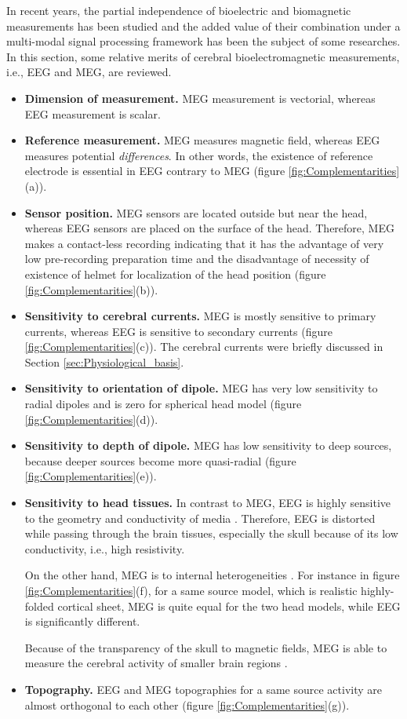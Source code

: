 In recent years, the partial independence of bioelectric and biomagnetic measurements has been studied and the added value of their combination under a multi-modal signal processing framework has been the subject of some researches.
In this section, some relative merits of cerebral bioelectromagnetic measurements, i.e., EEG and MEG, are reviewed.
\begin{itemize}
\item \textbf{Dimension of measurement.} MEG measurement is vectorial, whereas EEG measurement is scalar.
\item \textbf{Reference measurement.} MEG measures magnetic field, whereas EEG measures potential \emph{differences}.
In other words, the existence of reference electrode is essential in EEG contrary to MEG (figure \ref{fig:Complementarities}(a)).
\item \textbf{Sensor position.} MEG sensors are located outside but near the head, whereas EEG sensors are placed on the surface of the head.
Therefore, MEG makes a contact-less recording indicating that it has the advantage of very low pre-recording preparation time and the disadvantage of necessity of existence of helmet for localization of the head position (figure \ref{fig:Complementarities}(b)).
\item \textbf{Sensitivity to cerebral currents.} MEG is mostly sensitive to primary currents, whereas EEG is sensitive to secondary currents (figure \ref{fig:Complementarities}(c)).
The cerebral currents were briefly discussed in Section \ref{sec:Physiological_basis}.
\item \textbf{Sensitivity to orientation of dipole.} MEG has very low sensitivity to radial dipoles and is zero for spherical head model \cite{Ahlfors2010} (figure \ref{fig:Complementarities}(d)).
\item \textbf{Sensitivity to depth of dipole.} MEG has low sensitivity to deep sources, because deeper sources become more quasi-radial (figure \ref{fig:Complementarities}(e)).
\item \textbf{Sensitivity to head tissues.} In contrast to MEG, EEG is highly sensitive to the geometry and conductivity of media \cite{Acar2003,Gencer2004}.
Therefore, EEG is distorted while passing through the brain tissues, especially the skull because of its low conductivity, i.e., high resistivity.

On the other hand, MEG is  to internal heterogeneities \cite{Hari2017}.
For instance in figure \ref{fig:Complementarities}(f), for a same source model, which is realistic highly-folded cortical sheet, MEG is quite equal for the two head models, while EEG is significantly different.

Because of the transparency of the skull to magnetic fields, MEG is able to measure the cerebral activity of smaller brain regions \cite{Malmivuo2011}.
\item \textbf{Topography.} EEG and MEG topographies for a same source activity are almost orthogonal to each other (figure \ref{fig:Complementarities}(g)).
\end{itemize}
